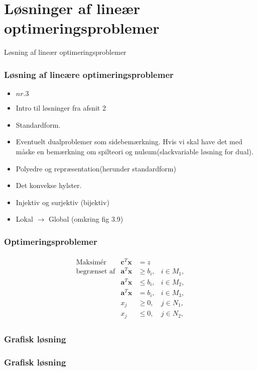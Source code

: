 \section{Løsninger af lineær optimeringsproblemer}
%
\begin{frame}
\centering
\Huge
Løsning af lineær optimeringsproblemer 
\end{frame}
%
\begin{frame}
\frametitle{Løsning af lineære \phantom{HHHHHHHH} optimeringsproblemer}
\begin{itemize}
\item \textbf{$nr. 3$}
\item Intro til løsninger fra afsnit 2
\item Standardform.
\item Eventuelt dualproblemer som sidebemærkning. Hvis vi skal have det med måske en bemærkning om spilteori og nulsum(slackvariable løsning for dual).
\item Polyedre og repræsentation(herunder standardform)
\item Det konvekse hylster.
\item Injektiv og surjektiv (bijektiv)
\item Lokal $\rightarrow$ Global (omkring fig 3.9)
\end{itemize}
\end{frame}

\begin{frame}
\frametitle{Optimeringsproblemer}
\begin{align*}
\begin{array}{lrll}
\text{Maksimér}		&\textbf{c}^T\textbf{x}	& = z		&\\
\text{begrænset af}	&\textbf{a}^T\textbf{x}	&\geq b_i,	&i \in M_1,\\
					&\textbf{a}^T\textbf{x}	&\leq b_i,	&i \in M_2,\\
					&\textbf{a}^T\textbf{x}	& = b_i,	&i \in M_3,\\
					&x_j					&\geq 0,	&j \in N_1,\\
					&x_j					&\leq 0,	&j \in N_2,
\end{array}
\end{align*}
\end{frame}

\begin{frame}
\frametitle{Grafisk løsning}

\end{frame}

\begin{frame}
\frametitle{Grafisk løsning}

\end{frame}

